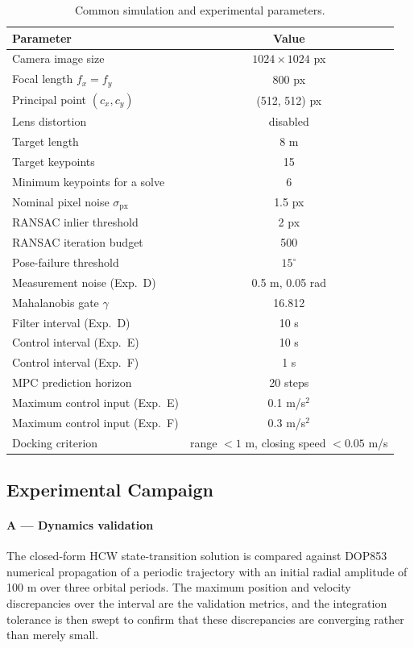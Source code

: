 \begin{table}[!tb]
\centering
\caption{Common simulation and experimental parameters.}
\label{tab:experimental_parameters}
\begin{tabular}{lc}
\toprule
\textbf{Parameter} & \textbf{Value} \\
\midrule
Camera image size & $1024\times1024$ px \\
Focal length $f_x=f_y$ & 800 px \\
Principal point $(c_x,c_y)$ & (512, 512) px \\
Lens distortion & disabled \\
Target length & 8 m \\
Target keypoints & 15 \\
Minimum keypoints for a solve & 6 \\
Nominal pixel noise $\sigma_{\mathrm{px}}$ & 1.5 px \\
RANSAC inlier threshold & 2 px \\
RANSAC iteration budget & 500 \\
Pose-failure threshold & $15^\circ$ \\
Measurement noise (Exp.~D) & 0.5 m, 0.05 rad \\
Mahalanobis gate $\gamma$ & 16.812 \\
Filter interval (Exp.~D) & 10 s \\
Control interval (Exp.~E) & 10 s \\
Control interval (Exp.~F) & 1 s \\
MPC prediction horizon & 20 steps \\
Maximum control input (Exp.~E) & 0.1 m/s$^2$ \\
Maximum control input (Exp.~F) & 0.3 m/s$^2$ \\
Docking criterion & range $<1$ m, closing speed $<0.05$ m/s \\
\bottomrule
\end{tabular}
\end{table}

\subsection{Experimental Campaign}

\paragraph{A --- Dynamics validation}
The closed-form HCW state-transition solution is compared against DOP853
numerical propagation of a periodic trajectory with an initial radial
amplitude of 100 m over three orbital periods. The maximum position and
velocity discrepancies over the interval are the validation metrics, and the
integration tolerance is then swept to confirm that these discrepancies are
converging rather than merely small.

